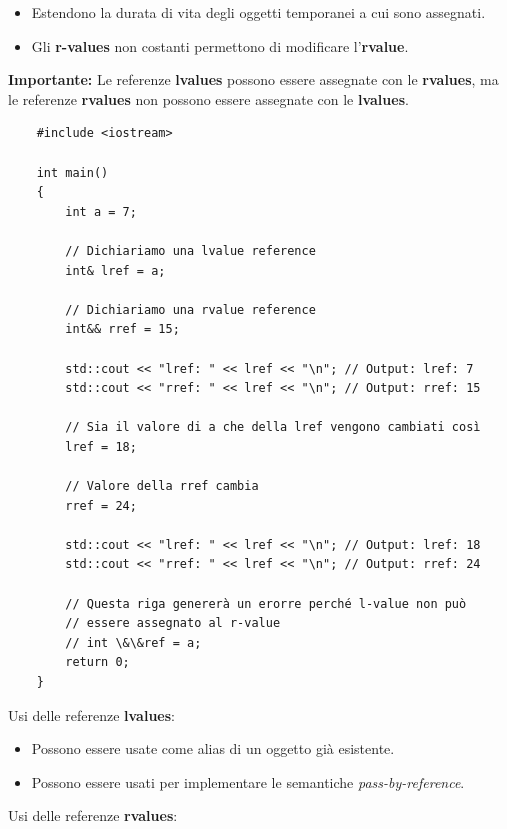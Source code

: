 \begin{itemize}
	\item \textsf{\small Estendono la durata di vita degli oggetti temporanei a cui sono assegnati.}
	\item \textsf{\small Gli \textbf{r-values} non costanti permettono di modificare l'\textbf{rvalue}.}
\end{itemize}

\textsf{\small \textbf{Importante: } Le referenze \textbf{lvalues} possono essere assegnate con le \textbf{rvalues}, ma le referenze \textbf{rvalues} non possono essere assegnate con le \textbf{lvalues}.} \\

\begin{lstlisting}
	#include <iostream>
	
	int main()
	{
		int a = 7;
		
		// Dichiariamo una lvalue reference
		int& lref = a;
		
		// Dichiariamo una rvalue reference
		int&& rref = 15;
		
		std::cout << "lref: " << lref << "\n"; // Output: lref: 7
		std::cout << "rref: " << lref << "\n"; // Output: rref: 15
		
		// Sia il valore di a che della lref vengono cambiati così
		lref = 18;
		
		// Valore della rref cambia
		rref = 24;
		
		std::cout << "lref: " << lref << "\n"; // Output: lref: 18
		std::cout << "rref: " << lref << "\n"; // Output: rref: 24
		
		// Questa riga genererà un erorre perché l-value non può
		// essere assegnato al r-value 
		// int \&\&ref = a;
		return 0;
	}
\end{lstlisting}

\textsf{\small Usi delle referenze \textbf{lvalues}: } \\

\begin{itemize}
	\item \textsf{\small Possono essere usate come alias di un oggetto già esistente.}
	\item \textsf{\small Possono essere usati per implementare le semantiche \emph{pass-by-reference}.}
\end{itemize}

\textsf{\small Usi delle referenze \textbf{rvalues}: } \\

